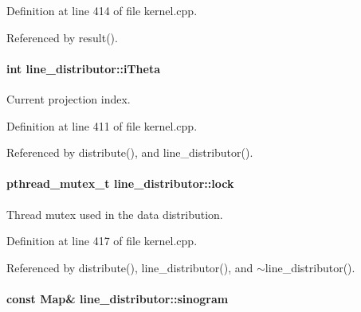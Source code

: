 Definition at line 414 of file kernel.cpp.



Referenced by result().

\hypertarget{classline__distributor_ae28a2177cfe9ee1543be5acd2cd71021}{
\paragraph[{iTheta}]{\setlength{\rightskip}{0pt plus 5cm}int {\bf line\_\-distributor::iTheta}}\hfill}
\label{classline__distributor_ae28a2177cfe9ee1543be5acd2cd71021}


Current projection index. 



Definition at line 411 of file kernel.cpp.



Referenced by distribute(), and line\_\-distributor().

\hypertarget{classline__distributor_af8b21b97322b11c4c1c26d476a5dc5f3}{
\paragraph[{lock}]{\setlength{\rightskip}{0pt plus 5cm}pthread\_\-mutex\_\-t {\bf line\_\-distributor::lock}}\hfill}
\label{classline__distributor_af8b21b97322b11c4c1c26d476a5dc5f3}


Thread mutex used in the data distribution. 



Definition at line 417 of file kernel.cpp.



Referenced by distribute(), line\_\-distributor(), and $\sim$line\_\-distributor().

\hypertarget{classline__distributor_a0555ca96a9a71a22d2461b3696f9b790}{
\paragraph[{sinogram}]{\setlength{\rightskip}{0pt plus 5cm}const {\bf Map}\& {\bf line\_\-distributor::sinogram}}\hfill}
\label{classline__distributor_a0555ca96a9a71a22d2461b3696f9b790}


